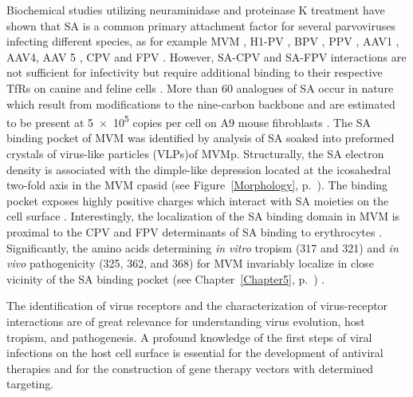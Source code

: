 Biochemical studies utilizing neuraminidase and proteinase K treatment have shown that SA is a common primary attachment factor for several parvoviruses infecting different species, as for example MVM \cite{pmid3296697, pmid16415031}, H1-PV \cite{pmid22258256}, BPV \cite{pmid15750863, pmid9747725, pmid15269359}, PPV \cite{pmid20484503}, AAV1 \cite{pmid16943302, pmid16940521}, AAV4, AAV 5 \cite{pmid15761263, pmid11435568, pmid11262413, pmid16409121}, CPV and FPV \cite{pmid1329321, pmid7975239}. However, SA-CPV and SA-FPV interactions are not sufficient for infectivity but require additional binding to their respective TfRs on canine and feline cells \cite{pmid1329321, pmid12525605, pmid11264378, pmid12885908}. More than 60 analogues of SA occur in nature which result from modifications to the nine-carbon backbone \cite{pmid17072005} and are estimated to be present at 5~$\times$~10\textsuperscript{5} copies per cell on A9 mouse fibroblasts \cite{pmid20517, pmid6602221}. The SA binding pocket of MVM was identified by analysis of SA soaked into preformed crystals of virus-like particles (VLPs)\footnotemark of MVMp. Structurally, the SA electron density is associated with the dimple-like depression located at the icosahedral two-fold axis in the MVM cpasid (see Figure~\ref{Morphology}, p.~\pageref{Morphology}). The binding pocket exposes highly positive charges which interact with SA moieties on the cell surface \cite{pmid16415031}. Interestingly, the localization of the SA binding domain in MVM is proximal to the CPV and FPV determinants of SA binding to erythrocytes \cite{pmid7645206, pmid8392729, pmid1329321, pmid10884355}. Significantly, the amino acids determining \textit{in vitro} tropism (317 and 321) and \textit{in vivo} pathogenicity (325, 362, and 368) for MVM invariably localize in close vicinity of the SA binding pocket (see Chapter~\ref{Chapter5}, p.~\pageref{Chapter5}) \cite{pmid16103145}.                  

The identification of virus receptors and the characterization of virus-receptor interactions are of great relevance for understanding virus evolution, host tropism, and pathogenesis. A profound knowledge of the first steps of viral infections on the host cell surface is essential for the development of antiviral therapies and for the construction of gene therapy vectors with determined targeting.    



